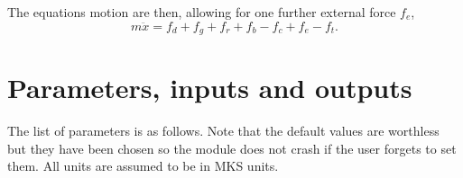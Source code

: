 \documentclass[10pt,notitlepage,abstracton]{scrartcl}
\theoremstyle{plain}
\theoremstyle{plain}
\theoremstyle{plain}
\begin{document}
The equations motion are then, allowing for one further external force $f_{e}$, 
\begin{equation}
  \label{eq:7}
  m\ddot{x} = f_{d} + f_{g} + f_{r} + f_{b} - f_{c} + f_{e} - f_{t}. 
\end{equation}


\section{Parameters, inputs and outputs}
\label{sec:param-inputs-outp}

The list of parameters is as follows.  Note that the default values are
worthless but they have been chosen so the module does not crash if the
user forgets to set them.  All units are assumed to be in MKS units. 


\renewcommand{\arraystretch}{1.5}
\end{document}
